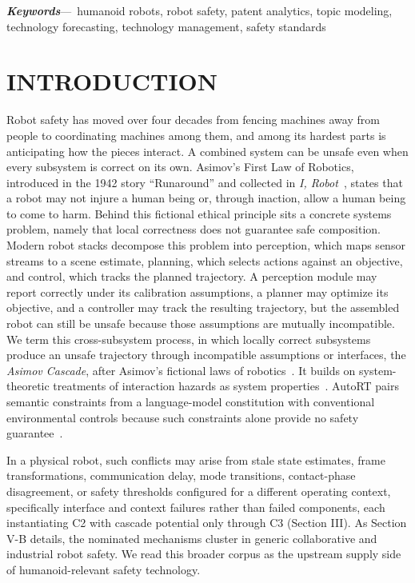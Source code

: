 \documentclass[letterpaper,9pt,conference]{ieeeconf}
\begin{document}
{\small\par\noindent\textbf{\textit{Keywords}}---\,\ignorespaces
humanoid robots, robot safety, patent analytics, topic modeling, technology forecasting, technology management, safety standards\par}

\section{INTRODUCTION}

Robot safety has moved over four decades from fencing machines away from people to coordinating machines among them, and among its hardest parts is anticipating how the pieces interact. A combined system can be unsafe even when every subsystem is correct on its own. Asimov's First Law of Robotics, introduced in the 1942 story ``Runaround'' and collected in \textit{I, Robot}~\cite{asimov1950}, states that a robot may not injure a human being or, through inaction, allow a human being to come to harm. Behind this fictional ethical principle sits a concrete systems problem, namely that local correctness does not guarantee safe composition. Modern robot stacks decompose this problem into perception, which maps sensor streams to a scene estimate, planning, which selects actions against an objective, and control, which tracks the planned trajectory. A perception module may report correctly under its calibration assumptions, a planner may optimize its objective, and a controller may track the resulting trajectory, but the assembled robot can still be unsafe because those assumptions are mutually incompatible. We term this cross-subsystem process, in which locally correct subsystems produce an unsafe trajectory through incompatible assumptions or interfaces, the \emph{Asimov Cascade}, after Asimov's fictional laws of robotics~\cite{asimov1950}. It builds on system-theoretic treatments of interaction hazards as system properties~\cite{leveson2011,gupta2024,chakraborty2025,desai2019}. AutoRT pairs semantic constraints from a language-model constitution with conventional environmental controls because such constraints alone provide no safety guarantee~\cite{autort2024,deepmind2024}.

In a physical robot, such conflicts may arise from stale state estimates, frame transformations, communication delay, mode transitions, contact-phase disagreement, or safety thresholds configured for a different operating context, specifically interface and context failures rather than failed components, each instantiating C2 with cascade potential only through C3 (Section III). As Section V-B details, the nominated mechanisms cluster in generic collaborative and industrial robot safety. We read this broader corpus as the upstream supply side of humanoid-relevant safety technology.
\end{document}
